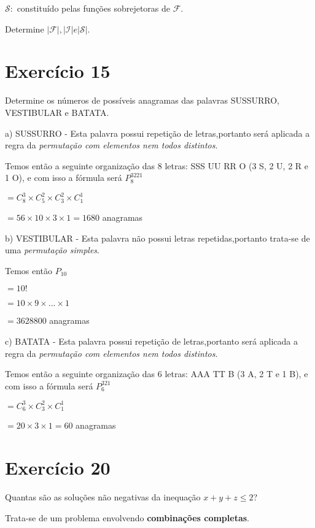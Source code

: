 \documentclass[12pt]{article}
\begin{document}
$\mathcal{S}:$ constituído pelas funções sobrejetoras de $\mathcal{F}$.

Determine $|\mathcal{F}|, |\mathcal{I}| e |\mathcal{S}|$.

\section*{Exercício 15}

Determine os números de possíveis anagramas das palavras SUSSURRO, VESTIBULAR e BATATA.

\bigskip

a) SUSSURRO - Esta palavra possui repetição de letras,portanto será aplicada a regra da \textit{permutação com elementos nem todos distintos}.

Temos então a seguinte organização das 8 letras: SSS UU RR O (3 S, 2 U, 2 R e 1 O), e com isso a fórmula será $\displaystyle P_{8}^{3221} $

$= C_8^3 \times C_5^2 \times C_3^2 \times C_1^1$

$=56 \times 10 \times 3 \times 1 = 1680$ anagramas

\bigskip

b) VESTIBULAR - Esta palavra não possui letras repetidas,portanto trata-se de uma \textit{permutação simples}.

Temos então $P_{10}$

$= 10!$

$= 10 \times 9 \times ... \times 1$

$= 3628800$ anagramas

\bigskip

c) BATATA - Esta palavra possui repetição de letras,portanto será aplicada a regra da \textit{permutação com elementos nem todos distintos}.

Temos então a seguinte organização das 6 letras: AAA TT B (3 A, 2 T e 1 B), e com isso a fórmula será $\displaystyle P_{6}^{321} $

$= C_6^3 \times C_3^2 \times C_1^1$

$= 20 \times 3 \times 1 = 60$ anagramas

\section*{Exercício 20}

Quantas são as soluções não negativas da inequação $x + y + z \leq 2$?

Trata-se de um problema envolvendo \textbf{combinações completas}. \medskip
\end{document}
